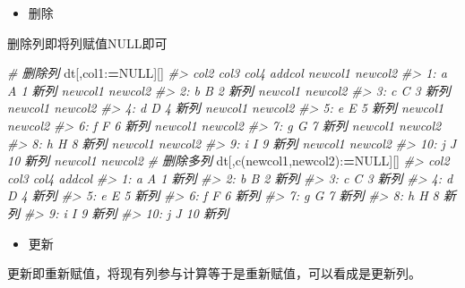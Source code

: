 \documentclass[
]{book}
\newenvironment{Shaded}{\begin{snugshade}}{\end{snugshade}}
\newcommand{\CommentTok}[1]{\textcolor[rgb]{0.56,0.35,0.01}{\textit{#1}}}
\newcommand{\ConstantTok}[1]{\textcolor[rgb]{0.00,0.00,0.00}{#1}}
\newcommand{\ErrorTok}[1]{\textcolor[rgb]{0.64,0.00,0.00}{\textbf{#1}}}
\newcommand{\FunctionTok}[1]{\textcolor[rgb]{0.00,0.00,0.00}{#1}}
\newcommand{\NormalTok}[1]{#1}
\newcommand{\SpecialCharTok}[1]{\textcolor[rgb]{0.00,0.00,0.00}{#1}}
\newcommand{\StringTok}[1]{\textcolor[rgb]{0.31,0.60,0.02}{#1}}
\providecommand{\tightlist}{%
  \setlength{\itemsep}{0pt}\setlength{\parskip}{0pt}}
\begin{document}
\begin{itemize}
\tightlist
\item
  删除
\end{itemize}

删除列即将列赋值NULL即可

\begin{Shaded}
\begin{Highlighting}[]
\CommentTok{\# 删除列}
\NormalTok{dt[,col1}\SpecialCharTok{:}\ErrorTok{=}\ConstantTok{NULL}\NormalTok{][]}
\CommentTok{\#\textgreater{}     col2 col3 col4 addcol newcol1 newcol2}
\CommentTok{\#\textgreater{}  1:    a    A    1   新列 newcol1 newcol2}
\CommentTok{\#\textgreater{}  2:    b    B    2   新列 newcol1 newcol2}
\CommentTok{\#\textgreater{}  3:    c    C    3   新列 newcol1 newcol2}
\CommentTok{\#\textgreater{}  4:    d    D    4   新列 newcol1 newcol2}
\CommentTok{\#\textgreater{}  5:    e    E    5   新列 newcol1 newcol2}
\CommentTok{\#\textgreater{}  6:    f    F    6   新列 newcol1 newcol2}
\CommentTok{\#\textgreater{}  7:    g    G    7   新列 newcol1 newcol2}
\CommentTok{\#\textgreater{}  8:    h    H    8   新列 newcol1 newcol2}
\CommentTok{\#\textgreater{}  9:    i    I    9   新列 newcol1 newcol2}
\CommentTok{\#\textgreater{} 10:    j    J   10   新列 newcol1 newcol2}
\CommentTok{\# 删除多列}
\NormalTok{dt[,}\FunctionTok{c}\NormalTok{(}\StringTok{\textquotesingle{}newcol1\textquotesingle{}}\NormalTok{,}\StringTok{\textquotesingle{}newcol2\textquotesingle{}}\NormalTok{)}\SpecialCharTok{:}\ErrorTok{=}\ConstantTok{NULL}\NormalTok{][]}
\CommentTok{\#\textgreater{}     col2 col3 col4 addcol}
\CommentTok{\#\textgreater{}  1:    a    A    1   新列}
\CommentTok{\#\textgreater{}  2:    b    B    2   新列}
\CommentTok{\#\textgreater{}  3:    c    C    3   新列}
\CommentTok{\#\textgreater{}  4:    d    D    4   新列}
\CommentTok{\#\textgreater{}  5:    e    E    5   新列}
\CommentTok{\#\textgreater{}  6:    f    F    6   新列}
\CommentTok{\#\textgreater{}  7:    g    G    7   新列}
\CommentTok{\#\textgreater{}  8:    h    H    8   新列}
\CommentTok{\#\textgreater{}  9:    i    I    9   新列}
\CommentTok{\#\textgreater{} 10:    j    J   10   新列}
\end{Highlighting}
\end{Shaded}

\begin{itemize}
\tightlist
\item
  更新
\end{itemize}

更新即重新赋值，将现有列参与计算等于是重新赋值，可以看成是更新列。
\end{document}
